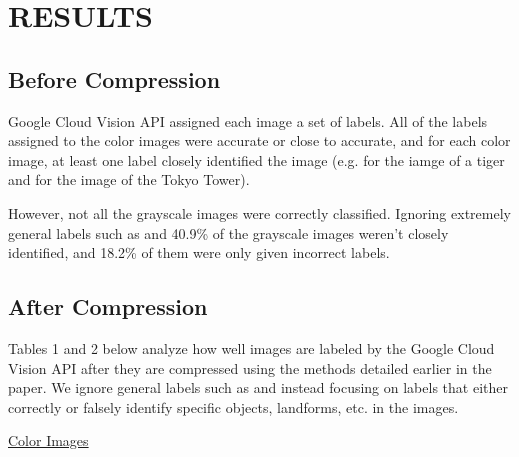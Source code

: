 \documentclass[letterpaper, 10 pt, conference]{ieeeconf}  %
\begin{document}
\vspace*{3mm}

\section{RESULTS}

\subsection{Before Compression}

Google Cloud Vision API assigned each image a set of labels.
All of the labels assigned to the color images were
accurate or close to accurate, and for each color image,
at least one label closely identified the image (e.g. 
for the iamge of a tiger and  for the image of
the Tokyo Tower).

However, not all the grayscale images were correctly classified.
Ignoring extremely general labels such as 
and  40.9\% of the grayscale images
weren't closely identified, and 18.2\% of them were only given incorrect labels.

\subsection{After Compression}

Tables 1 and 2 below analyze how well images are labeled by the
Google Cloud Vision API after they are compressed using
the methods detailed earlier in the paper. We ignore general
labels such as  
and  instead focusing on labels that either correctly or falsely
identify specific objects, landforms, etc. in the images.

\vspace*{2mm}

\hspace*{28mm} \underline{Color Images}

\vspace*{2mm}
\end{document}
